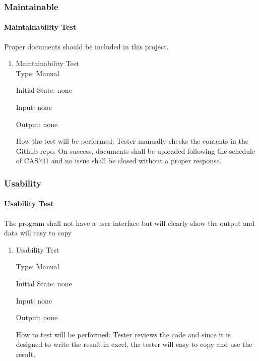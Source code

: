 \documentclass[12pt, titlepage]{article}
\begin{document}
\subsubsection{Maintainable}\label{Amaintain}

\paragraph{Maintainability Test} Proper documents should be included in this project. 

\begin{enumerate}
\item{Maintainability Test}\\

Type: Manual
					
Initial State: none
					
Input: none
					
Output: none
					
How the test will be performed: Tester manually checks the contents in the Github repo. On success, documents shall be uploaded following the schedule of CAS741 and no issue shall be closed without a proper response.

\end{enumerate}

\subsubsection{Usability}\label{Audst}

\paragraph{Usability Test}  The program shall not have a user interface but will clearly show the output and data will easy to copy 

\begin{enumerate}
\item{Usability Test\\}

Type: Manual
					
Initial State: none
					
Input: none
					
Output: none
					
How to test will be performed: Tester reviews the code and since it is designed to write the result in excel, the tester will easy to copy and use the result.

\end{enumerate}
\end{document}
